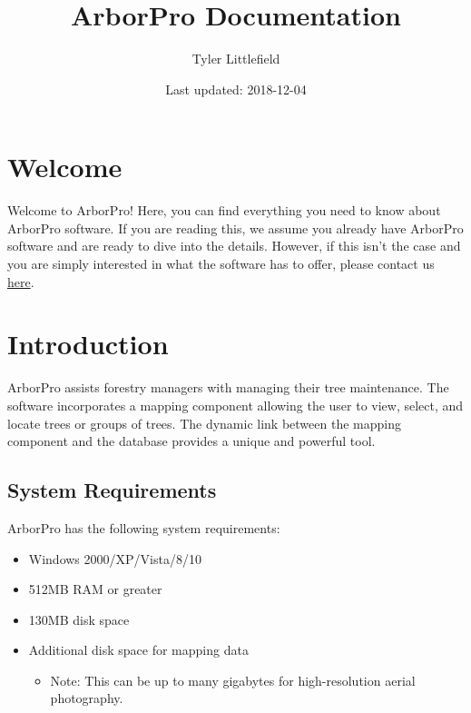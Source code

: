 \documentclass[]{book}
\title{ArborPro Documentation}
\author{Tyler Littlefield}
\date{Last updated: 2018-12-04}
\providecommand{\tightlist}{%
  \setlength{\itemsep}{0pt}\setlength{\parskip}{0pt}}
\begin{document}
\maketitle

{
\setcounter{tocdepth}{1}
\tableofcontents
}
\hypertarget{welcome}{%
\chapter*{Welcome}\label{welcome}}

Welcome to ArborPro! Here, you can find everything you need to know
about ArborPro software. If you are reading this, we assume you already
have ArborPro software and are ready to dive into the details. However,
if this isn't the case and you are simply interested in what the
software has to offer, please contact us
\href{http://arborprousa.com/\#contacthome}{here}.

\hypertarget{intro}{%
\chapter{Introduction}\label{intro}}

ArborPro assists forestry managers with managing their tree maintenance.
The software incorporates a mapping component allowing the user to view,
select, and locate trees or groups of trees. The dynamic link between
the mapping component and the database provides a unique and powerful
tool.

\hypertarget{system-requirements}{%
\section{System Requirements}\label{system-requirements}}

ArborPro has the following system requirements:

\begin{itemize}
\tightlist
\item
  Windows 2000/XP/Vista/8/10
\item
  512MB RAM or greater
\item
  130MB disk space
\item
  Additional disk space for mapping data

  \begin{itemize}
  \tightlist
  \item
    Note: This can be up to many gigabytes for high-resolution aerial
    photography.
  \end{itemize}
\end{itemize}
\end{document}
